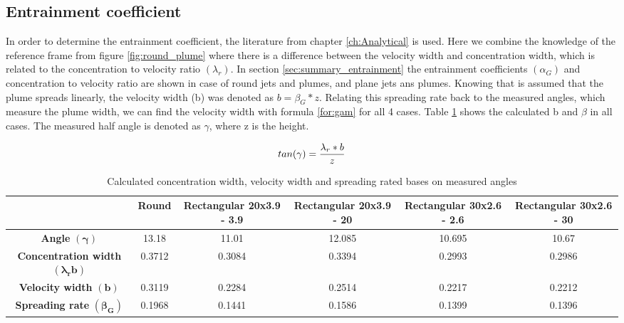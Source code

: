 \subsection{Entrainment coefficient}
In order to determine the entrainment coefficient, the literature from chapter \ref{ch:Analytical} is used. Here we combine the knowledge of the reference frame from figure \ref{fig:round_plume} where there is a difference between the velocity width and concentration width, which is related to the concentration to velocity ratio $(\lambda_r)$. In section \ref{sec:summary_entrainment} the entrainment coefficients $(\alpha_G)$ and concentration to velocity ratio are shown in case of round jets and plumes, and plane jets ans plumes. Knowing that is assumed that the plume spreads linearly, the velocity width (b) was denoted as $b = \beta_G * z$. Relating this spreading rate back to the measured angles, which measure the plume width, we can find the velocity width with formula \ref{for:gam} for all 4 cases. Table \ref{tab:b} shows the calculated b and $\beta$ in all cases. The measured half angle is denoted as $\gamma$, where z is the height.


\begin{equation}
    \centering
    tan (\gamma) = \frac{\lambda_r * b}{z}
    \label{for:gam}
\end{equation}


\begin{table}[ht!]
\centering
\begin{adjustbox}{max width =\textwidth}
\begin{tabular}{|c|c|c|c|c|c|}
\hline
 & \textbf{Round} & \textbf{Rectangular 20x3.9 - 3.9} & \textbf{Rectangular 20x3.9 - 20} & \textbf{Rectangular 30x2.6 - 2.6} & \textbf{Rectangular 30x2.6 - 30} \\ \hline
\textbf{Angle} $\bm{(\gamma)}$ & 13.18 & 11.01 & 12.085 & 10.695 & 10.67 \\ \hline
\textbf{Concentration width $\bm{(\lambda_r b)}$} & 0.3712 & 0.3084 & 0.3394 & 0.2993 & 0.2986 \\ \hline
\textbf{Velocity width} $\bm{(b)}$ & 0.3119 & 0.2284 & 0.2514 & 0.2217 & 0.2212 \\ \hline
\textbf{Spreading rate} $\bm{(\beta_G)}$ & 0.1968 & 0.1441 & 0.1586 & 0.1399 & 0.1396 \\ \hline
\end{tabular}
\end{adjustbox}
\caption{Calculated concentration width, velocity width and spreading rated bases on measured angles}
\label{tab:b}
\end{table}

